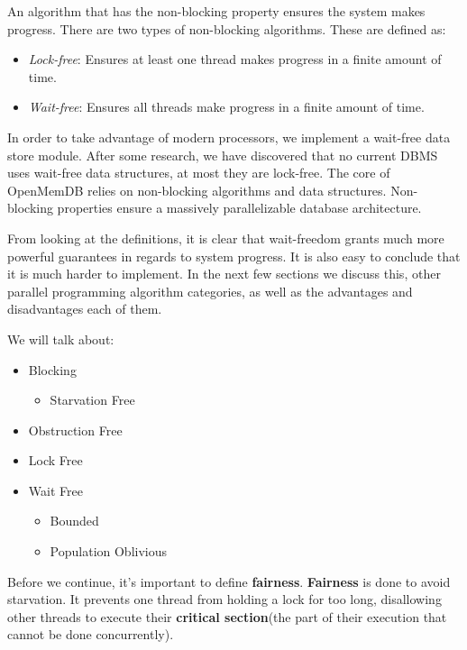 \documentclass[letterpaper, 12pt]{article}
\begin{document}
\par\vspace{\baselineskip}
An algorithm that has the non-blocking property ensures the system makes progress. There are 
two types of non-blocking algorithms. These are defined as:
\begin{itemize}
	\item \textit{Lock-free}: Ensures at least one thread makes progress in a finite amount of time.
	\item \textit{Wait-free}: Ensures all threads make progress in a finite amount of time.
\end{itemize}
In order to take advantage of modern processors, we implement a wait-free data store module.
After some research, we have discovered that no current DBMS uses wait-free data
structures, at most they are lock-free. The core of OpenMemDB relies on non-blocking algorithms and data
structures. Non-blocking properties ensure a massively parallelizable database architecture.

\par\vspace{\baselineskip}

From looking at the definitions, it is clear that wait-freedom grants much more
powerful guarantees in regards to system progress. It is also easy to conclude that
it is much harder to implement. In the next few sections we discuss this, other parallel 
programming algorithm categories, as well as the advantages and disadvantages each of them.

We will talk about:

\begin{itemize}
	\item Blocking
	\begin{itemize}
		\item Starvation Free
	\end{itemize}
	\item Obstruction Free
	\item Lock Free
	\item Wait Free
	\begin{itemize}
		\item Bounded
		\item Population Oblivious
	\end{itemize}
\end{itemize}

\newpage

Before we continue, it's important to define {\bfseries fairness}. {\bfseries Fairness} 
is done to avoid starvation. It prevents one thread from holding a lock for too long, 
disallowing other threads to execute their {\bfseries critical section}(the part of 
their execution that cannot be done concurrently).
\end{document}
